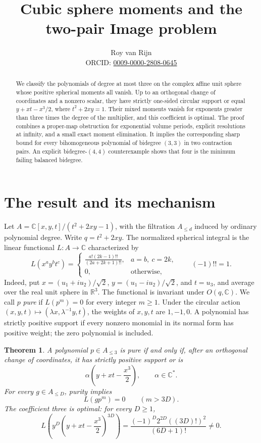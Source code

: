 \documentclass[11pt]{article}
\title{Cubic sphere moments and the two-pair Image problem}
\author{Roy van Rijn\\\small ORCID: \href{https://orcid.org/0009-0000-2808-0645}{0009-0000-2808-0645}}
\date{}
\newcommand{\C}{\mathbb C}
\newtheorem{theorem}{Theorem}[section]
\theoremstyle{remark}\newtheorem{remark}[theorem]{Remark}
\begin{document}
\maketitle
\begin{abstract}
We classify the polynomials of degree at most three on the complex affine
unit sphere whose positive spherical moments all vanish. Up to an
orthogonal change of coordinates and a nonzero scalar, they have strictly
one-sided circular support or equal \(y+xt-x^3/2\), where
\(t^2+2xy=1\). Their mixed moments vanish for exponents greater than three
times the degree of the multiplier, and this coefficient is optimal.
The proof combines a proper-map obstruction for exponential volume
periods, explicit resolutions at infinity, and a small exact moment
elimination. It implies the corresponding sharp bound for every
bihomogeneous polynomial of bidegree \((3,3)\) in two contraction pairs.
An explicit bidegree-\((4,4)\) counterexample shows that four is the
minimum failing balanced bidegree.
\end{abstract}

\section{The result and its mechanism}

Let \(A=\C[x,y,t]/(t^2+2xy-1)\), with the filtration \(A_{\leq d}\)
induced by ordinary polynomial degree. Write \(q=t^2+2xy\).
The normalized spherical integral is the linear functional \(L:A\to\C\)
characterized by
\begin{equation}\label{eq:moments}
 L(x^a y^b t^c)=
 \begin{cases}
 \displaystyle\frac{a!(2k-1)!!}{(2a+2k+1)!!},&a=b,\ c=2k,\\[4pt]
 0,&\text{otherwise},
 \end{cases}\qquad (-1)!!=1.
\end{equation}
Indeed, put \(x=(u_1+iu_2)/\sqrt2\),
\(y=(u_1-iu_2)/\sqrt2\), and \(t=u_3\), and average over the real
unit sphere in \(\mathbb R^3\). The functional is invariant under
\(O(q,\C)\). We call \(p\) \emph{pure} if \(L(p^m)=0\) for every
integer \(m\geq1\).
Under the circular action
\((x,y,t)\mapsto(\lambda x,\lambda^{-1}y,t)\), the weights of
\(x,y,t\) are \(1,-1,0\). A polynomial has strictly positive support
if every nonzero monomial in its normal form has positive weight;
the zero polynomial is included.

\begin{theorem}\label{thm:sphere}
A polynomial \(p\in A_{\leq3}\) is pure if and only if, after an
orthogonal change of coordinates, it has strictly positive support or is
\[
 \alpha\left(y+xt-\frac{x^3}{2}\right),\qquad \alpha\in\C^*.
\]
For every \(g\in A_{\leq D}\), purity implies
\begin{equation}\label{eq:cutoff}
 L(gp^m)=0\qquad(m>3D).
\end{equation}
The coefficient three is optimal: for every \(D\geq1\),
\begin{equation}\label{eq:sharp}
 L\left(y^D\left(y+xt-\frac{x^3}{2}\right)^{3D}\right)
 =\frac{(-1)^D2^{2D}((3D)!)^2}{(6D+1)!}\ne0.
\end{equation}
\end{theorem}
\end{document}
